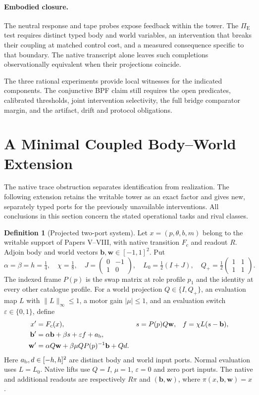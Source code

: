 \documentclass[11pt,a4paper]{article}
\theoremstyle{definition}
\newtheorem{definition}[theorem]{Definition}
\newcommand{\PiE}{\Pi_{\mathrm{E}}}
\begin{document}
\paragraph{Embodied closure.}
The neutral response and tape probes expose feedback within the tower. The $\PiE$ test requires distinct typed body and world variables, an intervention that breaks their coupling at matched control cost, and a measured consequence specific to that boundary. The native transcript alone leaves such completions observationally equivalent when their projections coincide.

The three rational experiments provide local witnesses for the indicated components. The conjunctive BPF claim still requires the open predicates, calibrated thresholds, joint intervention selectivity, the full bridge comparator margin, and the artifact, drift and protocol obligations.

\section{A Minimal Coupled Body--World Extension}

The native trace obstruction separates identification from realization. The following extension retains the writable tower as an exact factor and gives new, separately typed ports for the previously unavailable interventions. All conclusions in this section concern the stated operational tasks and rival classes.

\begin{definition}[Projected two-port system]\label{def:bridge-two-port-system}
Let $x=(p,\theta,b,m)$ belong to the writable support of Papers V--VIII, with native transition $F_c$ and readout $R$. Adjoin body and world vectors $\mathbf b,\mathbf w\in[-1,1]^2$. Put
\[
 \alpha=\beta=h=\tfrac14,\quad \chi=\tfrac18,\quad
 J=\begin{pmatrix}0&-1\\1&0\end{pmatrix},\quad
 L_0=\tfrac12(I+J),\quad
 Q_+=\tfrac12\begin{pmatrix}1&1\\1&1\end{pmatrix}.
\]
The indexed frame $P(p)$ is the swap matrix at role profile $p_1$ and the identity at every other catalogue profile. For a world projection $Q\in\{I,Q_+\}$, an evaluation map $L$ with $\|L\|_\infty\le1$, a motor gain $|\mu|\le1$, and an evaluation switch $\varepsilon\in\{0,1\}$, define
\begin{align*}
 x'&=F_c(x), &s&=P(p)Q\mathbf w, &f&=\chi L(s-\mathbf b),\\
 \mathbf b'&=\alpha\mathbf b+\beta s+\varepsilon f+a_{\rm b},\\
 \mathbf w'&=\alpha Q\mathbf w+\beta\mu QP(p)^{-1}\mathbf b+Qd.
\end{align*}
Here $a_{\rm b},d\in[-h,h]^2$ are distinct body and world input ports. Normal evaluation uses $L=L_0$. Native lifts use $Q=I$, $\mu=1$, $\varepsilon=0$ and zero port inputs. The native and additional readouts are respectively $R\pi$ and $(\mathbf b,\mathbf w)$, where $\pi(x,\mathbf b,\mathbf w)=x$.
\end{definition}
\end{document}
